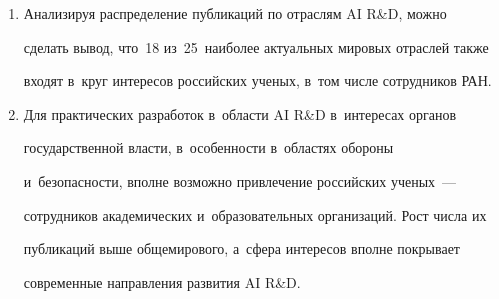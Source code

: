 \begin{enumerate}[1.]
\item Анализируя распределение публикаций по отраслям AI R\&D, можно 


сделать вывод, что~18 из~25~наиболее актуальных мировых отраслей также 


входят в~круг интересов российских ученых, в~том числе сотрудников РАН.


\item Для практических разработок в~области AI R\&D в~интересах органов 


государственной власти, в~особенности в~областях обороны


и~безопас\-ности, вполне возможно привлечение российских ученых~--- 


сотрудников академических и~образовательных организаций. Рост числа их 


публикаций выше общемирового, а~сфера интересов вполне покрывает 


современные направления развития AI R\&D.


\end{enumerate}


\vspace*{-1pt}





